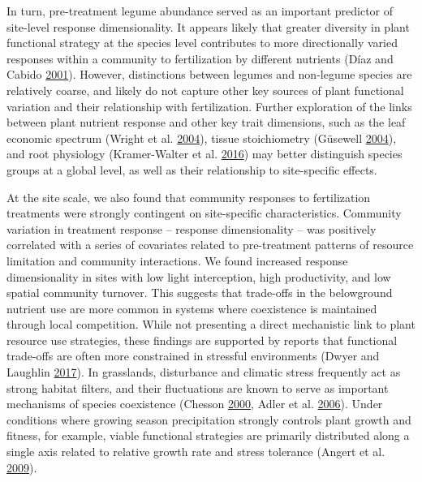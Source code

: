 \documentclass[twoside,12pt,final]{ucthesis-CA2012}
\begin{document}
\begin{ucmainmatter}
In turn, pre-treatment legume abundance served as an important predictor of site-level response dimensionality. It appears likely that greater diversity in plant functional strategy at the species level contributes to more directionally varied responses within a community to fertilization by different nutrients (Díaz and Cabido \protect\hyperlink{ref-Diaz2001}{2001}). However, distinctions between legumes and non-legume species are relatively coarse, and likely do not capture other key sources of plant functional variation and their relationship with fertilization. Further exploration of the links between plant nutrient response and other key trait dimensions, such as the leaf economic spectrum (Wright et al. \protect\hyperlink{ref-Wright2004}{2004}), tissue stoichiometry (Güsewell \protect\hyperlink{ref-Gusewell2004}{2004}), and root physiology (Kramer-Walter et al. \protect\hyperlink{ref-Kramer-Walter2016}{2016}) may better distinguish species groups at a global level, as well as their relationship to site-specific effects.

At the site scale, we also found that community responses to fertilization treatments were strongly contingent on site-specific characteristics. Community variation in treatment response -- response dimensionality -- was positively correlated with a series of covariates related to pre-treatment patterns of resource limitation and community interactions. We found increased response dimensionality in sites with low light interception, high productivity, and low spatial community turnover. This suggests that trade-offs in the belowground nutrient use are more common in systems where coexistence is maintained through local competition. While not presenting a direct mechanistic link to plant resource use strategies, these findings are supported by reports that functional trade-offs are often more constrained in stressful environments (Dwyer and Laughlin \protect\hyperlink{ref-Dwyer2017}{2017}). In grasslands, disturbance and climatic stress frequently act as strong habitat filters, and their fluctuations are known to serve as important mechanisms of species coexistence (Chesson \protect\hyperlink{ref-Chesson2000}{2000}, Adler et al. \protect\hyperlink{ref-Adler2006}{2006}). Under conditions where growing season precipitation strongly controls plant growth and fitness, for example, viable functional strategies are primarily distributed along a single axis related to relative growth rate and stress tolerance (Angert et al. \protect\hyperlink{ref-Angert2009}{2009}).


\end{ucmainmatter}
\end{document}
